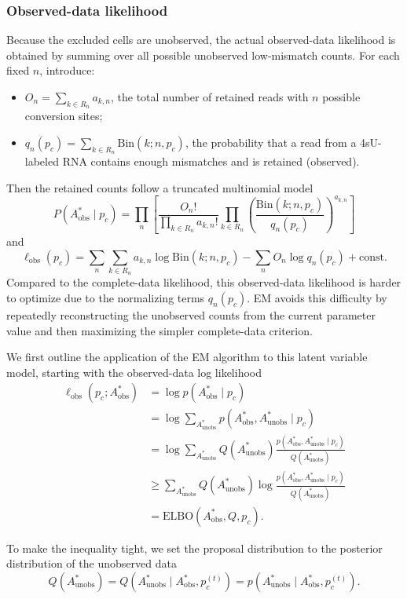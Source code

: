 \documentclass[11pt]{article}
\begin{document}
\subsubsection{Observed-data likelihood}

Because the excluded cells are unobserved, the actual observed-data likelihood is obtained by summing over all possible unobserved low-mismatch counts. For each fixed $n$, introduce:
\begin{itemize}
    \item $O_n=\sum_{k\in R_n} a_{k,n}$, the total number of retained reads with $n$ possible conversion sites;
    \item $q_n(p_c)=\sum_{k\in R_n}\mathrm{Bin}(k;n,p_c)$, the probability that a read from a 4sU-labeled RNA contains enough mismatches and is retained (observed).
\end{itemize}
Then the retained counts follow a truncated multinomial model
\[
P(A^*_\text{obs} \mid p_c)
=
\prod_n
\left[
\frac{O_n!}{\prod_{k\in R_n} a_{k,n}!}
\prod_{k\in R_n}
\left(\frac{\mathrm{Bin}(k;n,p_c)}{q_n(p_c)}\right)^{a_{k,n}}
\right]
\]
and
\[
\ell_{\mathrm{obs}}(p_c)
=
\sum_n\sum_{k\in R_n} a_{k,n}\log \mathrm{Bin}(k;n,p_c)
-\sum_n O_n\log q_n(p_c)
+\text{const}.
\]
Compared to the complete-data likelihood, this observed-data likelihood is harder to optimize due to the normalizing terms $q_n(p_c)$. EM avoids this difficulty by repeatedly reconstructing the unobserved counts from the current parameter value and then maximizing the simpler complete-data criterion.

We first outline the application of the EM algorithm to this latent variable model, starting with the observed-data log likelihood
$$
\begin{aligned}
\ell_\text{obs}(p_c; A_\text{obs}^*)
&= \log p(A_\text{obs}^* \mid p_c) \\
&= \log \sum_{A_\text{unobs}^*} p(A_\text{obs}^*, A_\text{unobs}^* \mid p_c) \\
&= \log \sum_{A_\text{unobs}^*} Q(A_\text{unobs}^*) \frac{p(A_\text{obs}^*, A_\text{unobs}^* \mid p_c)}{Q(A_\text{unobs}^*)} \\
&\geq \sum_{A_\text{unobs}^*} Q(A_\text{unobs}^*) \log \frac{p(A_\text{obs}^*, A_\text{unobs}^* \mid p_c)}{Q(A_\text{unobs}^*)} \\
&= \mathrm{ELBO}(A_\text{obs}^*, Q, p_c).
\end{aligned}
$$

To make the inequality tight, we set the proposal distribution to the posterior distribution of the unobserved data
$$
Q(A_\text{unobs}^*)
= Q(A_\text{unobs}^* \mid A_\text{obs}^*, p_c^{(t)})
= p(A_\text{unobs}^* \mid A_\text{obs}^*, p_c^{(t)}).
$$
\end{document}
